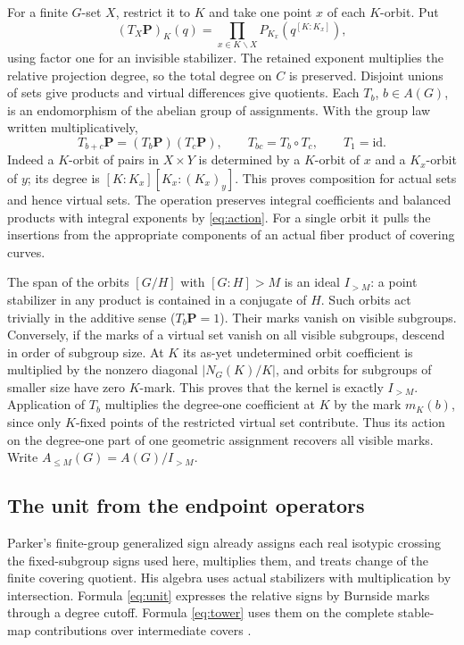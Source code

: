 For a finite \(G\)-set \(X\), restrict it to \(K\) and take one point \(x\) of each \(K\)-orbit. Put
\begin{equation}
(T_X\mathbf P)_K(q)=
       \prod_{x\in K\backslash X}P_{K_x}(q^{[K:K_x]}),                   \label{eq:action}
\end{equation}
using factor one for an invisible stabilizer. The retained exponent multiplies the relative projection degree, so the total degree on \(C\) is preserved. Disjoint unions of sets give products and virtual differences give quotients. Each \(T_b\), \(b\in A(G)\), is an endomorphism of the abelian group of assignments. With the group law written multiplicatively,
\[T_{b+c}\mathbf P=(T_b\mathbf P)(T_c\mathbf P),\qquad
 T_{bc}=T_b\circ T_c,\qquad T_1=\mathrm{id}.\]
Indeed a \(K\)-orbit of pairs in \(X\times Y\) is determined by a \(K\)-orbit of \(x\) and a \(K_x\)-orbit of \(y\); its degree is \([K:K_x][K_x:(K_x)_y]\). This proves composition for actual sets and hence virtual sets. The operation preserves integral coefficients and balanced products with integral exponents by \eqref{eq:action}. For a single orbit it pulls the insertions from the appropriate components of an actual fiber product of covering curves.

The span of the orbits \([G/H]\) with \([G:H]>M\) is an ideal \(I_{>M}\): a point stabilizer in any product is contained in a conjugate of \(H\). Such orbits act trivially in the additive sense (\(T_b\mathbf P=1\)). Their marks vanish on visible subgroups. Conversely, if the marks of a virtual set vanish on all visible subgroups, descend in order of subgroup size. At \(K\) its as-yet undetermined orbit coefficient is multiplied by the nonzero diagonal \(|N_G(K)/K|\), and orbits for subgroups of smaller size have zero \(K\)-mark. This proves that the kernel is exactly \(I_{>M}\). Application of \(T_b\) multiplies the degree-one coefficient at \(K\) by the mark \(m_K(b)\), since only \(K\)-fixed points of the restricted virtual set contribute. Thus its action on the degree-one part of one geometric assignment recovers all visible marks. Write \(A_{\le M}(G)=A(G)/I_{>M}\).

\subsection{The unit from the endpoint operators}

Parker's finite-group generalized sign already assigns each real isotypic crossing the fixed-subgroup signs used here, multiplies them, and treats change of the finite covering quotient. His algebra uses actual stabilizers with multiplication by intersection. Formula \eqref{eq:unit} expresses the relative signs by Burnside marks through a degree cutoff. Formula \eqref{eq:tower} uses them on the complete stable-map contributions over intermediate covers \cite{parker}.

